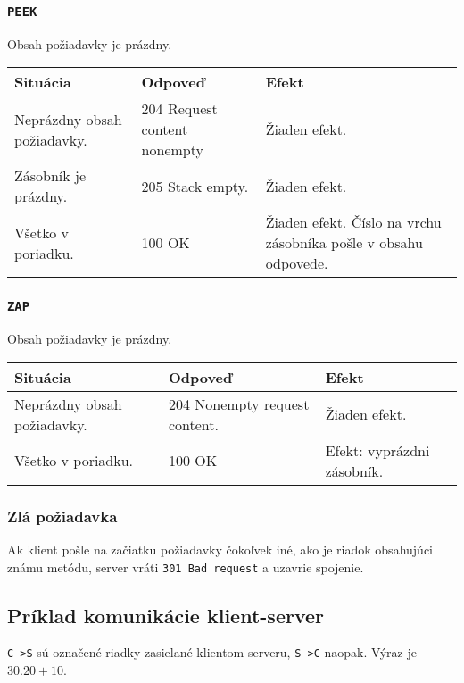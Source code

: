 \documentclass[11pt]{article}
\theoremstyle{definition}
\begin{document}
\subsubsection{\tt PEEK}
Obsah požiadavky je prázdny.
\begin{longtable}{|p{12em}|p{12em}|p{15em}|}
\hline
	\textbf{Situácia}
	&
	\textbf{Odpoveď}
	& 
	\textbf{Efekt}\\
\endhead
\hline
	Neprázdny obsah požiadavky.
	&	
	204 Request content nonempty
	&
	Žiaden efekt.\\
\hline
	Zásobník je prázdny.
	&	
	205 Stack empty.
	&
	Žiaden efekt.\\
\hline
	Všetko v poriadku. 
	&
	100 OK
	&
	Žiaden efekt.
	Číslo na vrchu zásobníka pošle v obsahu odpovede.\\
\hline
\end{longtable}
\subsubsection{\tt ZAP}
Obsah požiadavky je prázdny.
\begin{longtable}{|p{12em}|p{12em}|p{15em}|}
\hline
	\textbf{Situácia}
	&
	\textbf{Odpoveď}
	& 
	\textbf{Efekt}\\
\endhead
\hline
	Neprázdny obsah požiadavky.
	&	
	204 Nonempty request content.
	&
	Žiaden efekt.\\
\hline
	Všetko v poriadku. 
	&
	100 OK
	&
	Efekt: vyprázdni zásobník.\\
\hline
\end{longtable}
\subsubsection{Zlá požiadavka}
Ak klient pošle na začiatku požiadavky čokoľvek iné, ako je
riadok obsahujúci známu metódu, server vráti {\tt 301 Bad request} a uzavrie spojenie.

\subsection{Príklad komunikácie klient-server}
{\tt C->S} sú označené riadky zasielané klientom serveru, {\tt S->C} naopak. Výraz je $30.20+10$.
\begin{framed}

\end{framed}
\end{document}

